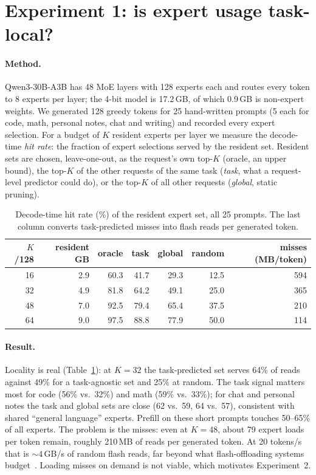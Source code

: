 \documentclass[11pt]{article}
\begin{document}
\section{Experiment 1: is expert usage task-local?}
\paragraph{Method.} Qwen3-30B-A3B has 48 MoE layers with 128 experts each and routes every token to 8
experts per layer; the 4-bit model is 17.2\,GB, of which 0.9\,GB is non-expert weights. We generated 128
greedy tokens for 25 hand-written prompts (5 each for code, math, personal notes, chat and writing) and
recorded every expert selection. For a budget of $K$ resident experts per layer we measure the decode-time
\emph{hit rate}: the fraction of expert selections served by the resident set. Resident sets are chosen,
leave-one-out, as the request's own top-$K$ (oracle, an upper bound), the top-$K$ of the other requests of
the same task (\emph{task}, what a request-level predictor could do), or the top-$K$ of all other requests
(\emph{global}, static pruning).

\begin{table}[h]
\centering\small
\caption{Decode-time hit rate (\%) of the resident expert set, all 25 prompts. The last column converts
task-predicted misses into flash reads per generated token.}
\label{tab:exp1}
\begin{tabular}{rrrrrrr}
\toprule
$K$/128 & resident GB & oracle & task & global & random & misses (MB/token) \\
\midrule
16 & 2.9 & 60.3 & 41.7 & 29.3 & 12.5 & 594 \\
32 & 4.9 & 81.8 & 64.2 & 49.1 & 25.0 & 365 \\
48 & 7.0 & 92.5 & 79.4 & 65.4 & 37.5 & 210 \\
64 & 9.0 & 97.5 & 88.8 & 77.9 & 50.0 & 114 \\
\bottomrule
\end{tabular}
\end{table}

\paragraph{Result.} Locality is real (Table~\ref{tab:exp1}): at $K{=}32$ the task-predicted set serves 64\%
of reads against 49\% for a task-agnostic set and 25\% at random. The task signal matters most for code
(56\% vs.\ 32\%) and math (59\% vs.\ 33\%); for chat and personal notes the task and global sets are close
(62 vs.\ 59, 64 vs.\ 57), consistent with shared ``general language'' experts. Prefill on these short
prompts touches 50--65\% of all experts. The problem is the misses: even at $K{=}48$, about 79 expert
loads per token remain, roughly 210\,MB of reads per generated token. At 20 tokens/s that is
${\sim}4$\,GB/s of random flash reads, far beyond what flash-offloading systems
budget~\cite{alizadeh2023flash,xue2024powerinfer2}. Loading misses on demand is not viable, which motivates
Experiment~2.
\end{document}
